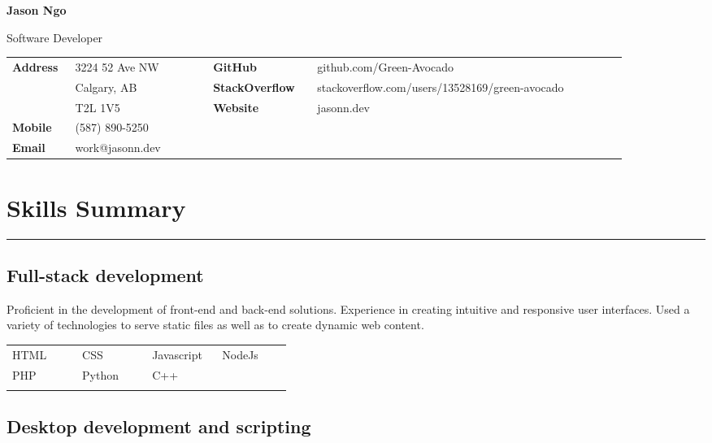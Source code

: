 \documentclass[letterpaper]{article}
\newcommand{\horizontalLine}{%
    \rule{\linewidth}{0.2pt}
    \vspace{1ex}
}
\begin{document}
    {\Huge
    \textbf{Jason Ngo}}

    {\large
    Software Developer}

    {\small%
        \renewcommand{\arraystretch}{1.5}
        \begin{tabular}{p{0.08\linewidth} p{0.2\linewidth} p{0.15\linewidth} p{0.45\linewidth}}
            \\
            \textbf{Address} & 3224 52 Ave NW & \textbf{GitHub} & github.com/Green-Avocado \\
            & Calgary, AB & \textbf{StackOverflow} & stackoverflow.com/users/13528169/green-avocado \\
            & T2L 1V5 & \textbf{Website} & jasonn.dev \\
            \textbf{Mobile} & (587) 890-5250 \\
            \textbf{Email} & work@jasonn.dev \\
        \end{tabular}
    }

    \section*{Skills Summary}

        \horizontalLine

        \subsection*{Full-stack development}

        Proficient in the development of front-end and back-end solutions.
        Experience in creating intuitive and responsive user interfaces.
        Used a variety of technologies to serve static files as well as to create dynamic web content.

        \begin{center}
        \begin{tabular}{p{0.22\linewidth} p{0.22\linewidth} p{0.22\linewidth} p{0.22\linewidth}}
            \\
            HTML & CSS & Javascript & NodeJs \\
            PHP & Python & C++ &\\
            \\
        \end{tabular}
        \end{center}

        \subsection*{Desktop development and scripting}
\end{document}
